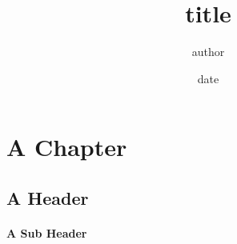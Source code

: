 \documentclass[11pt, letterpaper]{article}
\title{title}
\author{author}
\date{date}
\begin{document}
\maketitle
\chapter{A Chapter}
\section{A Header}
\subsubsection{A Sub Header}
\end{document}
